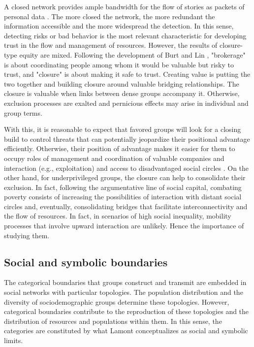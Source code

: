 A closed network provides ample bandwidth for the flow of stories as packets of personal data \parencite{burt_brokerage_2005}. The more closed the network, the more redundant the information accessible and the more widespread the detection. In this sense, detecting risks or bad behavior is the most relevant characteristic for developing trust in the flow and management of resources. However, the results of closure-type equity are mixed. Following the development of Burt \parencite*{burt_brokerage_2005} and Lin \parencite*{lin_social_2002}, "brokerage" is about coordinating people among whom it would be valuable but risky to trust, and "closure" is about making it safe to trust. Creating value is putting the two together and building closure around valuable bridging relationships. The closure is valuable when links between dense groups accompany it. Otherwise, exclusion processes are exalted and pernicious effects may arise in individual and group terms.
\bigskip

With this, it is reasonable to expect that favored groups will look for a closing build to control threats that can potentially jeopardize their positional advantage efficiently. Otherwise, their position of advantage makes it easier for them to occupy roles of management and coordination of valuable companies and interaction (e.g., exploitation) and access to disadvantaged social circles \parencite{erickson_culture_1996}. On the other hand, for underprivileged groups, the closure can help to consolidate their exclusion. In fact, following the argumentative line of social capital, combating poverty consists of increasing the possibilities of interaction with distant social circles and, eventually, consolidating bridges that facilitate interconnectivity and the flow of resources. In fact, in scenarios of high social inequality, mobility processes that involve upward interaction are unlikely. Hence the importance of studying them.

\subsection{Social and symbolic boundaries}

The categorical boundaries that groups construct and transmit are embedded in social networks with particular topologies. The population distribution and the diversity of sociodemographic groups determine these topologies. However, categorical boundaries contribute to the reproduction of these topologies and the distribution of resources and populations within them. In this sense, the categories are constituted by what Lamont conceptualizes as social and symbolic limits.
\bigskip

